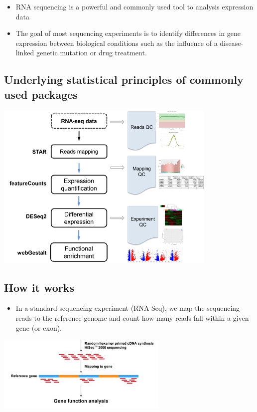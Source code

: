 \documentclass[
]{book}
\providecommand{\tightlist}{%
  \setlength{\itemsep}{0pt}\setlength{\parskip}{0pt}}
\begin{document}
\begin{itemize}
\tightlist
\item
  RNA sequencing is a powerful and commonly used tool to analysis expression data
\item
  The goal of most sequencing experiments is to identify differences in gene expression between biological conditions such as the influence of a disease-linked genetic mutation or drug treatment.
\end{itemize}

\hypertarget{underlying-statistical-principles-of-commonly-used-packages}{%
\subsection{Underlying statistical principles of commonly used packages}\label{underlying-statistical-principles-of-commonly-used-packages}}

\includegraphics[width=0.5\linewidth]{./2_64}

\hypertarget{how-it-works}{%
\subsection{How it works}\label{how-it-works}}

\begin{itemize}
\tightlist
\item
  In a standard sequencing experiment (RNA-Seq), we map the sequencing reads to the reference genome and count how many reads fall within a given gene (or exon).
\end{itemize}

\includegraphics[width=0.5\linewidth]{./2_65}
\end{document}
